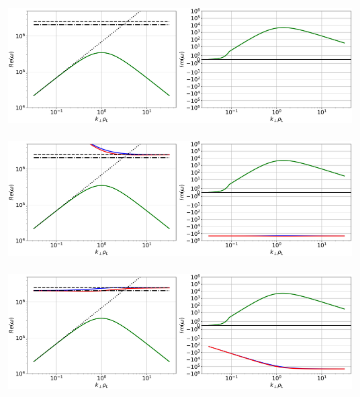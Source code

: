 \begin{figure}[H]
	\centering
	\begin{subfigure}[t]{0.85\textwidth}
		\centering
		\includegraphics[width=1\textwidth]{schemes/modes_ES.jpg}
		\label{fig:anal_modesES}
	\end{subfigure}
\end{figure}
\begin{figure}[H]
	\ContinuedFloat
	\centering
	\begin{subfigure}[t]{0.85\textwidth}
		\centering
		\includegraphics[width=1\textwidth]{schemes/modes_ES-inert.jpg}
		\label{fig:anal_modesEI}
	\end{subfigure}
\end{figure}
\begin{figure}[H]
	\ContinuedFloat
	\centering
	\begin{subfigure}[t]{0.85\textwidth}
		\centering
		\includegraphics[width=1\textwidth]{schemes/modes_EM.jpg}
		\label{fig:anal_modesEM}
	\end{subfigure}
\end{figure}
